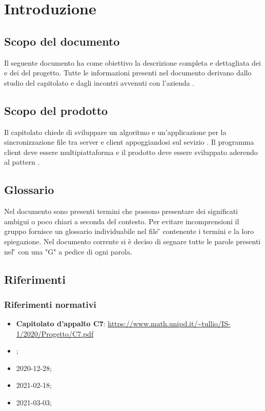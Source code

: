 \section{Introduzione}
\subsection{Scopo del documento}
Il seguente documento ha come obiettivo la descrizione completa e dettagliata dei  e dei  del progetto. Tutte le informazioni presenti nel documento derivano dallo studio del capitolato e dagli incontri avvenuti con l'azienda .

\subsection{Scopo del prodotto}
Il capitolato chiede di sviluppare un algoritmo e un'applicazione per la sincronizzazione file tra server e client appoggiandosi sul sevizio .
Il programma client deve essere multipiattaforma e il prodotto deve essere sviluppato aderendo al pattern .

\subsection{Glossario}
Nel documento sono presenti termini che possono presentare dei significati ambigui o poco chiari a seconda del contesto.
Per evitare incomprensioni il gruppo fornisce un glossario individuabile nel file \G{} \versGlo{} contenente i termini e la loro spiegazione.\newline{}
Nel documento corrente si è deciso di segnare tutte le parole presenti nel \G{} con una "G" a pedice di ogni parola.

\subsection{Riferimenti}
\subsubsection{Riferimenti normativi}
\begin{itemize}
\item \textbf{Capitolato d'appalto C7}:\newline
      \url{https://www.math.unipd.it/~tullio/IS-1/2020/Progetto/C7.pdf}
\item \NdP{} \versNdP{};
\item \VE{} 2020-12-28; %
\item \VE{} 2021-02-18; %
\item \VE{} 2021-03-03; %
\end{itemize}

